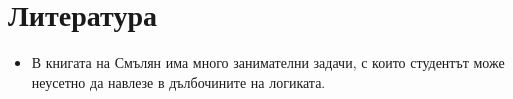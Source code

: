 \section*{Литература}

\begin{itemize}
\item 
  В книгата на Смълян \cite{smullyan} има много занимателни задачи, с които 
  студентът може неусетно да навлезе в дълбочините на логиката.
\end{itemize}


